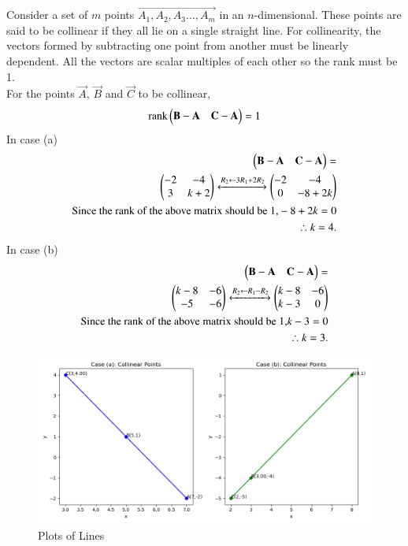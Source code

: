 \documentclass[journal]{IEEEtran}
\begin{document}
Consider a set of $m$ points $\vec{A_1,A_2,A_3\dots,A_m}$ in an $n$-dimensional. These points are said to be collinear if they all lie on a single straight line. For collinearity, the vectors formed by subtracting one point from another must be linearly dependent. All the vectors are scalar multiples of each other so the rank must be 1. \\
For the points $\vec{A}$, $\vec{B}$  and  $\vec{C}$ to be collinear,
\begin{align}
	\text{rank} \begin{pmatrix} \mathbf{B-A} & \mathbf{C-A}\end{pmatrix}=1
\end{align}
In case (a)
\begin{align*}
\begin{pmatrix} \mathbf{B-A} & \mathbf{C-A}\end{pmatrix}=\\
\begin{pmatrix} -2 & -4 \\ 3 & k+2\end{pmatrix} 
\xleftrightarrow[]{R_2 \leftarrow {3R_1+2R_2}}
\begin{pmatrix}-2 & -4 \\ 0 & -8+2k\end{pmatrix} \\
\text{Since the rank of the above matrix should be 1,}
-8+2k=0\\
\therefore k=4.
\end{align*}
In case (b)
\begin{align*}
\begin{pmatrix} \mathbf{B-A} & \mathbf{C-A}\end{pmatrix}=\\
\begin{pmatrix} k-8 & -6 \\ -5 & -6\end{pmatrix} 
\xleftrightarrow[]{R_2 \leftarrow {R_1-R_2}}
\begin{pmatrix}k-8 & -6 \\ k-3 & 0\end{pmatrix} \\
\text{Since the rank of the above matrix should be 1,}
k-3=0\\
\therefore k=3.
\end{align*}







\begin{figure}[h!]
   \centering
   \includegraphics[width=0.7\linewidth]{figs/Figure_1.png}
   \caption{Plots of Lines}
   \label{plot}
\end{figure}
\end{document}
